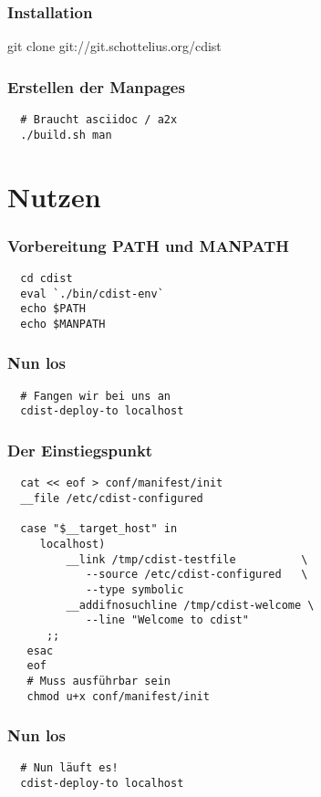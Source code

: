 \documentclass{beamer}
\begin{document}
\frame
{
  \frametitle{Installation}
  \begin{center}
  git clone git://git.schottelius.org/cdist
  \end{center}
}

\begin{frame}[fragile]
  \frametitle{Erstellen der Manpages}

  \begin{verbatim}
  # Braucht asciidoc / a2x
  ./build.sh man
  \end{verbatim}
\end{frame}

\section{Nutzen}
\begin{frame}[fragile]
  \frametitle{Vorbereitung PATH und MANPATH}

  \begin{verbatim}
  cd cdist
  eval `./bin/cdist-env`
  echo $PATH
  echo $MANPATH
  \end{verbatim}
\end{frame}

\begin{frame}[fragile]
  \frametitle{Nun los}
  \begin{verbatim}
  # Fangen wir bei uns an
  cdist-deploy-to localhost
  \end{verbatim}
\end{frame}

\begin{frame}[fragile]
  \frametitle{Der Einstiegspunkt}
  \begin{small}
  \begin{verbatim}
  cat << eof > conf/manifest/init
  __file /etc/cdist-configured

  case "$__target_host" in
     localhost)
         __link /tmp/cdist-testfile          \
            --source /etc/cdist-configured   \ 
            --type symbolic
         __addifnosuchline /tmp/cdist-welcome \
            --line "Welcome to cdist"
      ;;
   esac
   eof
   # Muss ausführbar sein
   chmod u+x conf/manifest/init

  \end{verbatim}
  \end{small}
\end{frame}

\begin{frame}[fragile]
  \frametitle{Nun los}
  \begin{verbatim}
  # Nun läuft es!
  cdist-deploy-to localhost
  \end{verbatim}
\end{frame}
\end{document}
